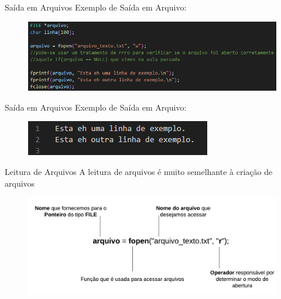 \begin{frame}{Saída em Arquivos}
Exemplo de Saída em Arquivo:
    \begin{figure}
        \centering
        \includegraphics[width=1\linewidth]{figuras/saidaArq.png}
    \end{figure}
\end{frame}

\begin{frame}{Saída em Arquivos}
Exemplo de Saída em Arquivo:
    \begin{figure}
        \centering
        \includegraphics[width=1\linewidth]{figuras/saidaArq2.png}
    \end{figure}
\end{frame}

\begin{frame}{Leitura de Arquivos}
    A leitura de arquivos é muito semelhante à criação de arquivos
    \begin{figure}
        \centering
        \includegraphics[width=1\linewidth]{figuras/ArqRead0.png}
    \end{figure}
\end{frame}

